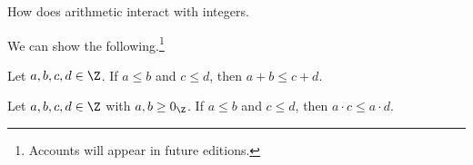 

How does arithmetic interact with integers.


We can show the following.\footnote{Accounts will appear in future editions.}

\begin{proposition}
  Let $a, b, c, d \in \Z$.
  If $a \leq b$ and $c \leq d$, then $a + b \leq c + d$.
\end{proposition}

\begin{proposition}
  Let $a, b, c, d \in \Z$ with $a, b \geq 0_{\Z}$.
  If $a \leq b$ and $c \leq d$, then $a \cdot c \leq a \cdot d$.
\end{proposition}

\blankpage
